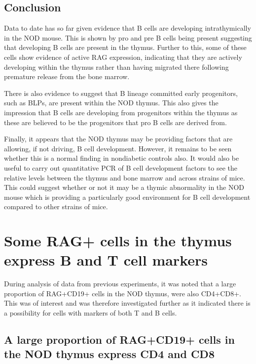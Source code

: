 

\subsection{Conclusion}

Data to date has so far given evidence that B cells are developing intrathymically in the NOD mouse.
This is shown by pro and pre B cells being present suggesting that developing B cells are present in the thymus.
Further to this, some of these cells show evidence of active RAG expression, indicating that they are actively developing within the thymus rather than having migrated there following premature release from the bone marrow.

There is also evidence to suggest that B lineage committed early progenitors, such as BLPs, are present within the NOD thymus. 
This also gives the impression that B cells are developing from progenitors within the thymus as these are believed to be the progenitors that pro B cells are derived from.

Finally, it appears that the NOD thymus may be providing factors that are allowing, if not driving, B cell development.
However, it remains to be seen whether this is a normal finding in nondiabetic controls also.
It would also be useful to carry out quantitative PCR of B cell development factors to see the relative levels between the thymus and bone marrow and across strains of mice.
This could suggest whether or not it may be a thymic abnormality in the NOD mouse which is providing a particularly good environment for B cell development compared to other strains of mice.

\section{Some RAG+ cells in the thymus express B and T cell markers}
During analysis of data from previous experiments, it was noted that a large proportion of RAG+CD19+ cells in the NOD thymus, were also CD4+CD8+.
This was of interest and was therefore investigated further as it indicated there is a possibility for cells with markers of both T and B cells.

\subsection{A large proportion of RAG+CD19+ cells in the NOD thymus express CD4 and CD8}

